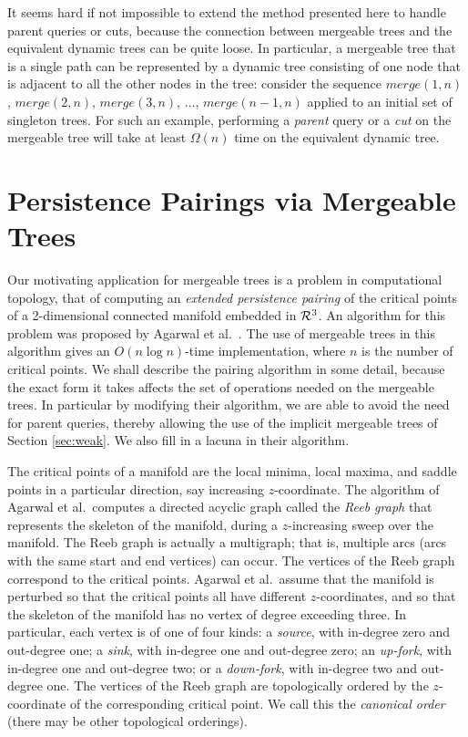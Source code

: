 \documentclass[twoside,leqno,twocolumn]{article}
\begin{document}
It seems hard if not impossible to extend the method presented here to handle parent queries or cuts, because the connection between mergeable trees and the equivalent dynamic trees can be quite loose.  In particular, a mergeable tree that is a single path can be represented by a dynamic tree consisting of one node that is adjacent to all the other nodes in the tree: consider the sequence $\mathit{merge}(1, n)$, $\mathit{merge}(2, n)$, $\mathit{merge}(3, n)$, $\ldots$, $\mathit{merge}(n-1, n)$ applied to an initial set of singleton trees.  For such an example, performing a \emph{parent} query or a \emph{cut} on the mergeable tree will take at least $\Omega(n)$ time on the equivalent dynamic tree.



\section{Persistence Pairings via Mergeable Trees}
\label{sec:pairing}

Our motivating application for mergeable trees is a problem in computational topology, that of computing an \emph{extended persistence pairing} of the critical points of a 2-dimensional connected manifold embedded in ${\cal R}^3$.  An algorithm for this problem was proposed by Agarwal et al.~\cite{AEHW04,AEHW06}.  The use of mergeable trees in this algorithm gives an $O(n \log n)$-time implementation, where $n$ is the number of critical points.  We shall describe the pairing algorithm in some detail, because the exact form it takes affects the set of operations needed on the mergeable trees.  In particular by modifying their algorithm, we are able to avoid the need for parent queries, thereby allowing the use of the implicit mergeable trees of Section \ref{sec:weak}.  We also fill in a lacuna in their algorithm.

The critical points of a manifold are the local minima, local maxima, and saddle points in a particular direction, say increasing $z$-coordinate.  The algorithm of Agarwal et al.\ computes a directed acyclic graph called the \emph{Reeb graph} that represents the skeleton of the manifold, during a $z$-increasing sweep over the manifold.  The Reeb graph is actually a multigraph; that is, multiple arcs (arcs with the same start and end vertices) can occur. The vertices of the Reeb graph correspond to the critical points. Agarwal et al.\ assume that the manifold is perturbed so that the critical points all have different $z$-coordinates, and so that the skeleton of the manifold has no vertex of degree exceeding three. In particular, each vertex is of one of four kinds: a \emph{source}, with in-degree zero and out-degree one; a \emph{sink}, with in-degree one and out-degree zero; an \emph{up-fork}, with in-degree one and out-degree two; or a \emph{down-fork}, with in-degree two and out-degree one.  The vertices of the Reeb graph are topologically ordered by the $z$-coordinate of the corresponding critical point. We call this the \emph{canonical order} (there may be other topological orderings).
\end{document}
